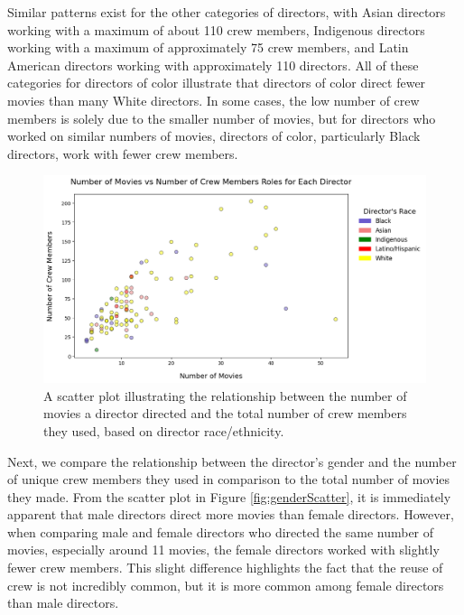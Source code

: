 \documentclass[12pt]{article}
\begin{document}
\par
Similar patterns exist for the other categories of directors, with Asian directors working with a maximum of about 110 crew members, Indigenous directors working with a maximum of approximately 75 crew members, and Latin American directors working with approximately 110 directors. All of these categories for directors of color illustrate that directors of color direct fewer movies than many White directors. In some cases, the low number of crew members is solely due to the smaller number of movies, but for directors who worked on similar numbers of movies, directors of color, particularly Black directors, work with fewer crew members.
\begin{figure}[H]
    \centering
    \includegraphics[width=350pt, scale=0.5] {3_scattermoviescrewrace.png}
    \caption{A scatter plot illustrating the relationship between the number of movies a director directed and the total number of crew members they used, based on director race/ethnicity.}
    \label{fig:raceScatter}
\end{figure}

Next, we compare the relationship between the director's gender and the number of unique crew members they used in comparison to the total number of movies they made. From the scatter plot in Figure \ref{fig:genderScatter}, it is immediately apparent that male directors direct more movies than female directors. However, when comparing male and female directors who directed the same number of movies, especially around 11 movies, the female directors worked with slightly fewer crew members. This slight difference highlights the fact that the reuse of crew is not incredibly common, but it is more common among female directors than male directors.
\end{document}
